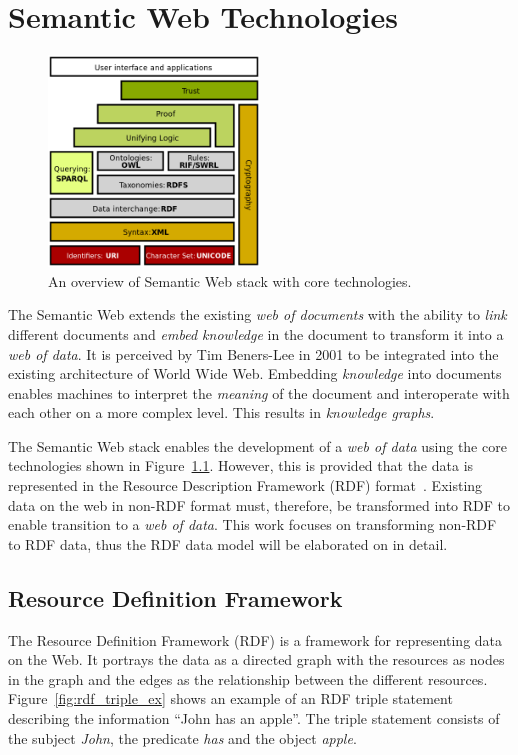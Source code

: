 \chapter{Semantic Web Technologies}
\label{chap:semantic_web}


\begin{figure}[htbp]
    \centering
    \includegraphics[width=0.5\textwidth]{fig/Semantic_web_stack.svg.png}
    \caption{An overview of Semantic Web stack with core technologies\cite{sem_web_stack}.}
    \label{fig:sem_web_stack}
\end{figure}

The Semantic Web extends the existing \emph{web of documents} with the ability 
to \emph{link} different documents and \emph{embed knowledge} in the document
to transform it into a \emph{web of data}. It is perceived by Tim Beners-Lee in 
2001\cite{bernerslee2001semantic} to be integrated into the existing architecture 
of World Wide Web. Embedding \emph{knowledge} into documents enables machines to
interpret the \emph{meaning} of the document and interoperate with each other on 
a more complex level. This results in \emph{knowledge graphs}. 

The Semantic Web stack enables the development of a \emph{web of data} using 
the core technologies shown in Figure~\ref{fig:sem_web_stack}. 
However, this is provided that the data is represented in the 
Resource Description Framework (RDF) format~\cite{rdf_concepts}. 
Existing data on the web in non-RDF format must, therefore, be transformed 
into RDF to enable transition to a \emph{web of data}. This work 
focuses on transforming non-RDF to RDF data, thus the RDF data model will be elaborated on
in detail. 



\section{Resource Definition Framework}
The Resource Definition Framework (RDF) \cite{rdf_concepts} is a framework for representing data on the Web.
It portrays the data as a directed graph with the resources as nodes in the graph and the
edges as the relationship between the different resources.
Figure~\ref{fig:rdf_triple_ex} shows an example of an RDF triple statement describing
the information “John has an apple”.
The triple statement consists of the subject \textit{John}, the predicate \textit{has}
and the object \textit{apple}.

